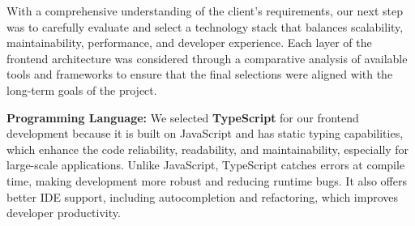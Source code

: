 With a comprehensive understanding of the client's requirements, our next step was to carefully evaluate and select a technology stack that balances scalability, maintainability, performance, and developer experience. Each layer of the frontend architecture was considered through a comparative analysis of available tools and frameworks to ensure that the final selections were aligned with the long-term goals of the project.

\begin{table}[H]
\centering
\caption{Programming Language Comparison}
\end{table}

\textbf{Programming Language:} We selected \textbf{TypeScript} for our frontend development because it is built on JavaScript and has static typing capabilities, which enhance the code reliability, readability, and maintainability, especially for large-scale applications. Unlike JavaScript, TypeScript catches errors at compile time, making development more robust and reducing runtime bugs. It also offers better IDE support, including autocompletion and refactoring, which improves developer productivity.\cite{javascript-official, typescript}

\vspace{2em}


